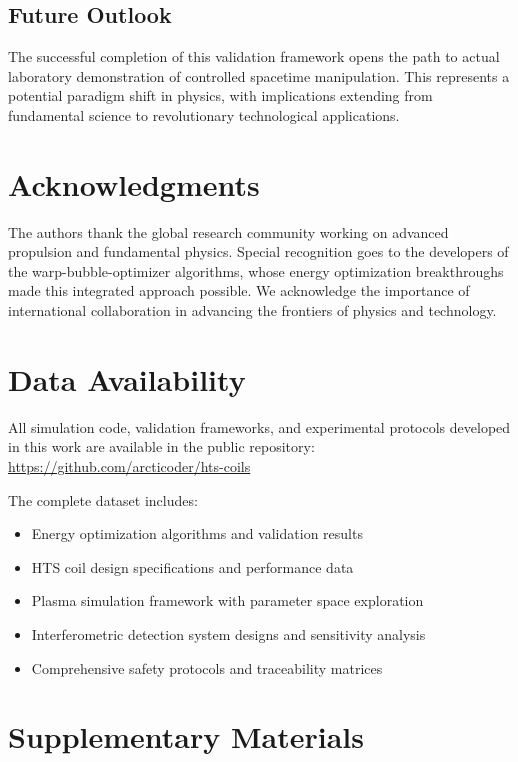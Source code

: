 \documentclass[12pt,a4paper]{article}
\begin{document}
\subsection{Future Outlook}
The successful completion of this validation framework opens the path to actual laboratory demonstration of controlled spacetime manipulation. This represents a potential paradigm shift in physics, with implications extending from fundamental science to revolutionary technological applications.

\section*{Acknowledgments}

The authors thank the global research community working on advanced propulsion and fundamental physics. Special recognition goes to the developers of the warp-bubble-optimizer algorithms, whose energy optimization breakthroughs made this integrated approach possible. We acknowledge the importance of international collaboration in advancing the frontiers of physics and technology.

\section*{Data Availability}

All simulation code, validation frameworks, and experimental protocols developed in this work are available in the public repository: \url{https://github.com/arcticoder/hts-coils}

The complete dataset includes:
\begin{itemize}
\item Energy optimization algorithms and validation results
\item HTS coil design specifications and performance data
\item Plasma simulation framework with parameter space exploration
\item Interferometric detection system designs and sensitivity analysis
\item Comprehensive safety protocols and traceability matrices
\end{itemize}



\appendix

\section{Supplementary Materials}
\end{document}
